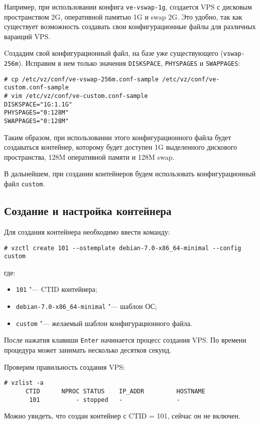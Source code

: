 Например, при использовании конфига \texttt{ve-vswap-1g}, создается VPS с дисковым пространством 2G, оперативной памятью 1G и swap 2G.
Это удобно, так как существует возможность создавать свои конфигурационные файлы для различных вараиций VPS.

Cоздадим свой конфигурационный файл, на базе уже существующего (\texttt{vswap-256m}).
Исправим в нем только значения \texttt{DISKSPACE}, \texttt{PHYSPAGES} и \texttt{SWAPPAGES}:
\begin{lstlisting}
# cp /etc/vz/conf/ve-vswap-256m.conf-sample /etc/vz/conf/ve-custom.conf-sample
# vim /etc/vz/conf/ve-custom.conf-sample
DISKSPACE="1G:1.1G"
PHYSPAGES="0:128M"
SWAPPAGES="0:128M"
\end{lstlisting}

Таким образом, при использовании этого конфигурационного файла будет создаваться контейнер, которому будет доступен 1G выделенного дискового пространства, 128M оперативной памяти и 128M swap.

В дальнейшем, при создании контейнеров будем использовать конфигурационный файл \texttt{custom}.

\subsection{Создание и настройка контейнера}
Для создания контейнера необходимо ввести команду:
\begin{lstlisting}
# vzctl create 101 --ostemplate debian-7.0-x86_64-minimal --config custom
\end{lstlisting}
где:
\begin{itemize}
    \item \texttt{101} "--- CTID контейнера;
    \item \texttt{debian-7.0-x86\_64-minimal} "--- шаблон ОС;
    \item \texttt{custom} "--- желаемый шаблон конфигурационного файла.
\end{itemize}

После нажатия клавиши \texttt{Enter} начинается процесс создания VPS. 
По времени процедура может занимать несколько десятков секунд.

Проверим правильность создания VPS:
\begin{lstlisting}
# vzlist -a
      CTID      NPROC STATUS    IP_ADDR         HOSTNAME
       101          - stopped   -               -
\end{lstlisting}

Можно увидеть, что создан контейнер с CTID = 101, сейчас он не включен.

